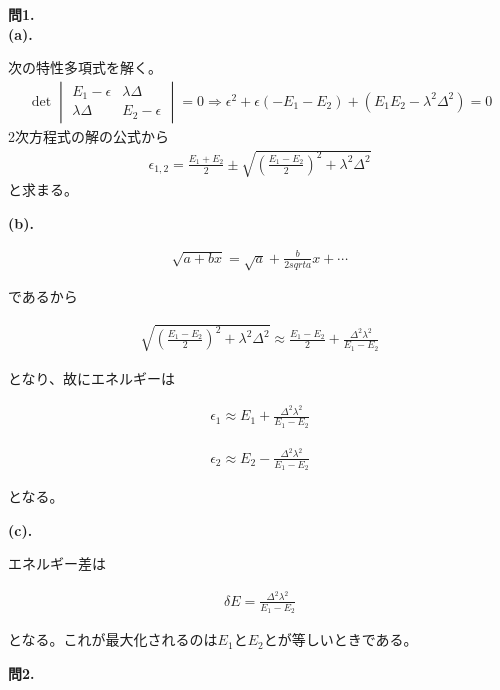 \documentclass{jlreq}
\begin{document}
\noindent
\textbf{問1.}\\


\noindent
\textbf{(a).}

次の特性多項式を解く。  
\begin{eqnarray}
    \det
    \begin{vmatrix}
        E_1-\epsilon & \lambda\Delta \\
        \lambda\Delta & E_2-\epsilon 
    \end{vmatrix}=0\Rightarrow \epsilon^2+\epsilon(-E_1-E_2)+(E_1E_2-\lambda^2\Delta^2)=0   
\end{eqnarray}  
2次方程式の解の公式から
\begin{eqnarray}
    \epsilon_{1,2}=\frac{E_1+E_2}{2}\pm\sqrt{\left(\frac{E_1-E_2}{2}\right)^2+\lambda^2\Delta^2}
\end{eqnarray}  
と求まる。

\noindent
\textbf{(b).}

\begin{eqnarray}
    \sqrt{a+bx}=\sqrt{a}+\frac{b}{2sqrt{a}}x+\cdots
\end{eqnarray}  

であるから

\begin{eqnarray}
    \sqrt{\left(\frac{E_1-E_2}{2}\right)^2+\lambda^2\Delta^2}\approx\frac{E_1-E_2}{2}+\frac{\Delta^2\lambda^2}{E_1-E_2}
\end{eqnarray}

となり、故にエネルギーは

\begin{eqnarray}
    \epsilon_1\approx E_1+\frac{\Delta^2\lambda^2}{E_1-E_2}
\end{eqnarray}

\begin{eqnarray}
    \epsilon_2\approx E_2-\frac{\Delta^2\lambda^2}{E_1-E_2}
\end{eqnarray}

となる。

\noindent
\textbf{(c).}

エネルギー差は

\begin{eqnarray}
\delta E=\frac{\Delta^2\lambda^2}{E_1-E_2}
\end{eqnarray}

となる。これが最大化されるのは$E_1$と$E_2$とが等しいときである。

\clearpage

\noindent
\textbf{問2.}\\
\end{document}
